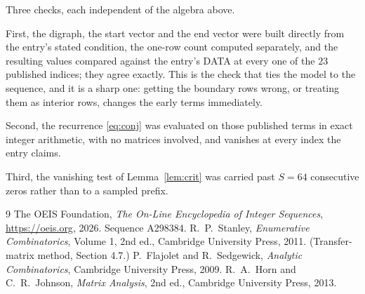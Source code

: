 \documentclass[11pt,a4paper]{article}
\theoremstyle{plain}
\theoremstyle{definition}
\begin{document}
Three checks, each independent of the algebra above.

First, the digraph, the start vector and the end vector were built directly from the
entry's stated condition, the one-row count computed separately, and the resulting values
compared against the entry's DATA at every one of the $23$ published indices; they
agree exactly. This is the check that ties the model to the sequence, and it is a sharp one:
getting the boundary rows wrong, or treating them as interior rows, changes the early terms
immediately.

Second, the recurrence \eqref{eq:conj} was evaluated on those published terms in exact
integer arithmetic, with no matrices involved, and vanishes at every index the entry claims.

Third, the vanishing test of Lemma~\ref{lem:crit} was carried past $S=64$ consecutive
zeros rather than to a sampled prefix.

\begin{thebibliography}{9}
 The OEIS Foundation, \emph{The On-Line Encyclopedia of Integer
Sequences}, \url{https://oeis.org}, 2026. Sequence A298384.
 R.~P.~Stanley, \emph{Enumerative Combinatorics}, Volume 1, 2nd ed.,
Cambridge University Press, 2011. (Transfer-matrix method, Section 4.7.)
 P.~Flajolet and R.~Sedgewick, \emph{Analytic Combinatorics}, Cambridge
University Press, 2009.
 R.~A.~Horn and C.~R.~Johnson, \emph{Matrix Analysis}, 2nd ed., Cambridge
University Press, 2013.
\end{thebibliography}
\end{document}
